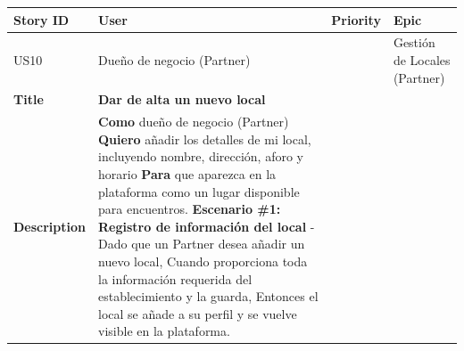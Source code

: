 {\def\LTcaptype{none} %
\begin{longtable}[]{@{}
  >{\raggedright\arraybackslash}p{}
  >{\raggedright\arraybackslash}p{}
  >{\raggedright\arraybackslash}p{}
  >{\raggedright\arraybackslash}p{}@{}}
\toprule\noalign{}
\begin{minipage}[b]{\linewidth}\raggedright
Story ID
\end{minipage} & \begin{minipage}[b]{\linewidth}\raggedright
User
\end{minipage} & \begin{minipage}[b]{\linewidth}\raggedright
Priority
\end{minipage} & \begin{minipage}[b]{\linewidth}\raggedright
Epic
\end{minipage} \\
\midrule\noalign{}
\endhead
\bottomrule\noalign{}
\endlastfoot
US10 & Dueño de negocio (Partner) & 5 & Gestión de Locales (Partner) \\
\textbf{Title} & \textbf{Dar de alta un nuevo local} & & \\
\textbf{Description} & \textbf{Como} dueño de negocio (Partner)
\textbf{Quiero} añadir los detalles de mi local, incluyendo nombre,
dirección, aforo y horario \textbf{Para} que aparezca en la plataforma
como un lugar disponible para encuentros. \textbf{Escenario \#1:
Registro de información del local} - Dado que un Partner desea añadir un
nuevo local, Cuando proporciona toda la información requerida del
establecimiento y la guarda, Entonces el local se añade a su perfil y se
vuelve visible en la plataforma. & & \\
\end{longtable}
}

